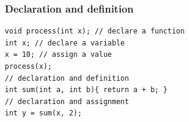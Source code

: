 
\begin{frame}
\end{frame}

\lstset{language=C++,numbers=none}
\begin{frame}[fragile]
\frametitle{Declaration and definition}
\begin{lstlisting}
void process(int x); // declare a function
int x; // declare a variable
x = 10; // assign a value
process(x);
// declaration and definition
int sum(int a, int b){ return a + b; }
// declaration and assignment
int y = sum(x, 2);
\end{lstlisting}
\end{frame}

